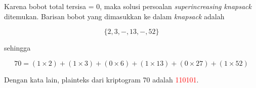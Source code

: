 \documentclass{article}
\begin{document}

Karena bobot total tersisa = 0, maka solusi persoalan \textit{superincreasing knapsack} ditemukan. Barisan bobot yang dimasukkan ke dalam \textit{knapsack} adalah

\[ \{2, 3, -, 13, -, 52\} \]

sehingga

\[ 70 = (1 \times 2) + (1 \times 3) + (0 \times 6) + (1 \times 13) + (0 \times 27) + (1 \times 52) \]

Dengan kata lain, plainteks dari kriptogram 70 adalah \textcolor{red}{110101}.
\end{document}
